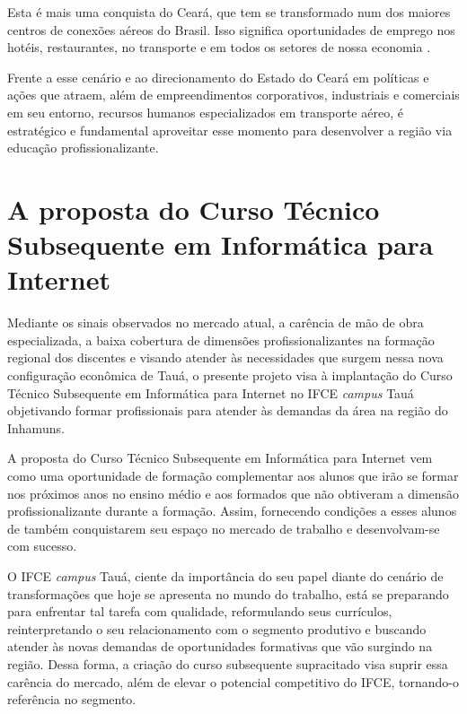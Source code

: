 \documentclass[
	12pt,				%
	openright,			%
	twoside,			%
	a4paper,			%
	chapter=TITLE,		%
	english,			%
	french,				%
	spanish,			%
	brazil,				%
	]{abntex2}
\begin{document}
\begin{citacao}
Esta é mais uma conquista do Ceará, que tem se transformado num dos maiores centros de conexões aéreos do Brasil. Isso significa oportunidades de emprego nos hotéis, restaurantes, no transporte e em todos os setores de nossa economia \cite{ceara2019camilo}.
\end{citacao}


Frente a esse cenário e ao direcionamento do Estado do Ceará em políticas e ações que atraem, além de empreendimentos corporativos, industriais e comerciais em seu entorno, recursos humanos especializados em transporte aéreo, é estratégico e fundamental aproveitar esse momento para desenvolver a região via educação profissionalizante.


\section{A proposta do Curso Técnico Subsequente em Informática para Internet}

Mediante os sinais observados no mercado atual, a carência de mão de obra especializada, a baixa cobertura de dimensões profissionalizantes na formação regional dos discentes e visando atender às necessidades que surgem nessa nova configuração econômica de Tauá, o presente projeto visa \`a implantação do Curso Técnico Subsequente em Informática para Internet no IFCE  
\textit{campus} Tauá objetivando formar profissionais para atender às demandas da área na região do Inhamuns.

A proposta do Curso Técnico Subsequente em Informática para Internet vem como
uma oportunidade de formação complementar aos alunos que irão se formar nos
próximos anos no ensino médio e aos formados que não obtiveram a dimensão
profissionalizante durante a formação. Assim, fornecendo condições a esses
alunos de também conquistarem seu espaço no mercado de trabalho e desenvolvam-se
com sucesso.


O IFCE \textit{campus} Tauá, ciente da importância do seu papel diante do cenário de transformações que hoje se apresenta no mundo do trabalho, está se preparando para enfrentar tal tarefa com qualidade, reformulando seus currículos, reinterpretando o seu relacionamento com o segmento produtivo e buscando atender às novas demandas de oportunidades formativas que vão surgindo na região. Dessa forma, a criação do curso subsequente supracitado visa suprir essa carência do mercado, além de elevar o potencial competitivo do IFCE, tornando-o referência no segmento.
\end{document}
